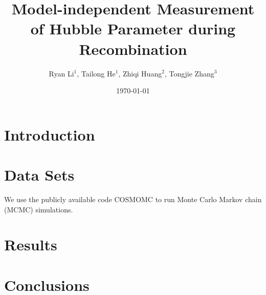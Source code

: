 \documentclass[10pt,prd,twocolumn]{revtex4-1}
\begin{document}
\title{Model-independent Measurement of Hubble Parameter during Recombination}
\author{Ryan Li$^1$, Tailong He$^1$, Zhiqi Huang$^{2}$, Tongjie Zhang$^3$}
\date{\today}
\begin{abstract}

\end{abstract}
\maketitle

\section{Introduction \label{sec:intro}}

\section{Data Sets \label{sec:data}}
We use the publicly available code COSMOMC \cite{cosmomc} to run Monte Carlo Markov chain (MCMC) simulations.
\section{Results \label{sec:res}}
\section{Conclusions \label{sec:conc}}





\end{document}
